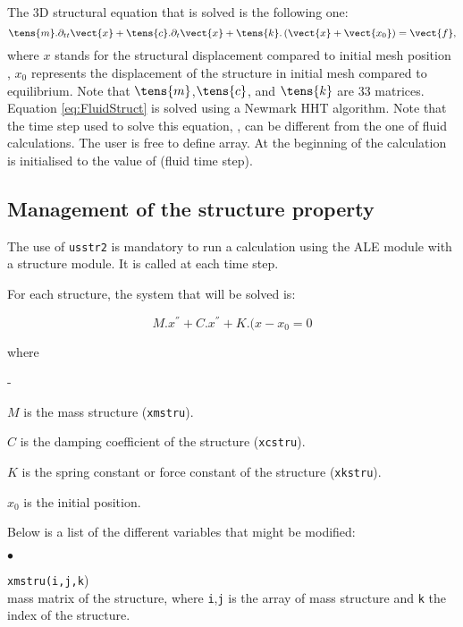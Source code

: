 {{The 3D structural equation that is solved is the following one:
\begin{equation}\label{eq:FluidStruct}
\displaystyle
\tens{m}.\partial_{tt}\vect{x}+\tens{c}.\partial_{t}\vect{x}+\tens{k}.\left(\vect{x}+\vect{x_0}\right)=\vect{f},
\end{equation}
where $x$ stands for the structural displacement compared to initial mesh position
 , $x_0$ represents
 the displacement of the structure in initial mesh compared to equilibrium.
Note that $\tens{m}$,$\tens{c}$, and $\tens{k}$ are 33 matrices.
Equation \eqref{eq:FluidStruct} is solved using a Newmark HHT algorithm.
Note that the time step used to solve this equation, , can be
 different from the one of fluid calculations. The user is free to define 
 array. At the beginning of the calculation  is initialised to the value of
  (fluid time step).

\subsection{Management of the structure property}

The use of \texttt{usstr2} is mandatory to run a calculation using the ALE
 module with a structure module. It is called at each time step.

For each structure, the system that will be solved is:

\begin{equation}
M.x^{''}+C.x^{''}+K.(x-x_{0} = 0
\end{equation}

where

\begin{list}{-}{}
 \item $M$ is the mass structure (\texttt{xmstru}).
 \item $C$ is the damping coefficient of the structure (\texttt{xcstru}).
 \item $K$ is the spring constant or force constant of the structure (\texttt{xkstru}).
 \item $x_{0}$ is the initial position.
\end{list}

Below is a list of the different variables that might be modified:

\begin{list}{$\bullet$}{}

\item{\texttt{xmstru(i,j,k})} \\
{mass matrix of the structure, where \texttt{i},\texttt{j} is
the array of mass structure and \texttt{k} the index of the structure.}


\end{list}}}
